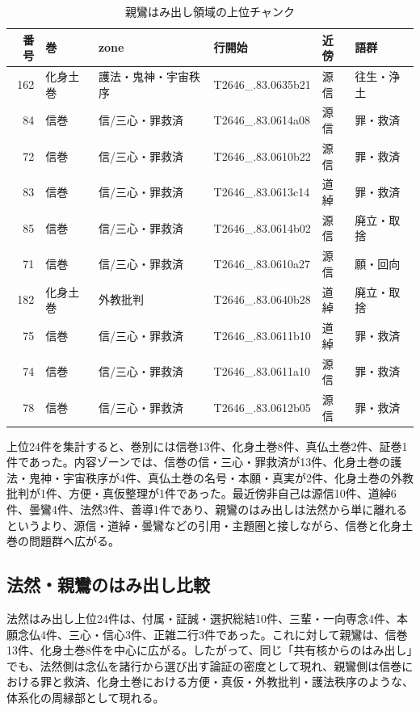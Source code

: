 \documentclass[uplatex,dvipdfmx,11pt,a4paper]{jsarticle}
\begin{document}
\begin{table}[H]
\centering
\small
\caption{親鸞はみ出し領域の上位チャンク}
\label{tab:shinran-protrusion}
\begin{tabular}{@{}rlllll@{}}
\toprule
番号 & 巻 & zone & 行開始 & 近傍 & 語群 \\
\midrule
162 & 化身土巻 & 護法・鬼神・宇宙秩序 & T2646\_.83.0635b21 & 源信 & 往生・浄土 \\
84 & 信巻 & 信/三心・罪救済 & T2646\_.83.0614a08 & 源信 & 罪・救済 \\
72 & 信巻 & 信/三心・罪救済 & T2646\_.83.0610b22 & 源信 & 罪・救済 \\
83 & 信巻 & 信/三心・罪救済 & T2646\_.83.0613c14 & 道綽 & 罪・救済 \\
85 & 信巻 & 信/三心・罪救済 & T2646\_.83.0614b02 & 源信 & 廃立・取捨 \\
71 & 信巻 & 信/三心・罪救済 & T2646\_.83.0610a27 & 源信 & 願・回向 \\
182 & 化身土巻 & 外教批判 & T2646\_.83.0640b28 & 道綽 & 廃立・取捨 \\
75 & 信巻 & 信/三心・罪救済 & T2646\_.83.0611b10 & 道綽 & 罪・救済 \\
74 & 信巻 & 信/三心・罪救済 & T2646\_.83.0611a10 & 源信 & 罪・救済 \\
78 & 信巻 & 信/三心・罪救済 & T2646\_.83.0612b05 & 源信 & 罪・救済 \\
\bottomrule
\end{tabular}
\end{table}

上位24件を集計すると、巻別には信巻13件、化身土巻8件、真仏土巻2件、証巻1件であった。内容ゾーンでは、信巻の信・三心・罪救済が13件、化身土巻の護法・鬼神・宇宙秩序が4件、真仏土巻の名号・本願・真実が2件、化身土巻の外教批判が1件、方便・真仮整理が1件であった。最近傍非自己は源信10件、道綽6件、曇鸞4件、法然3件、善導1件であり、親鸞のはみ出しは法然から単に離れるというより、源信・道綽・曇鸞などの引用・主題圏と接しながら、信巻と化身土巻の問題群へ広がる。

\subsection{法然・親鸞のはみ出し比較}

法然はみ出し上位24件は、付属・証誠・選択総結10件、三輩・一向専念4件、本願念仏4件、三心・信心3件、正雑二行3件であった。これに対して親鸞は、信巻13件、化身土巻8件を中心に広がる。したがって、同じ「共有核からのはみ出し」でも、法然側は念仏を諸行から選び出す論証の密度として現れ、親鸞側は信巻における罪と救済、化身土巻における方便・真仮・外教批判・護法秩序のような、体系化の周縁部として現れる。
\end{document}
